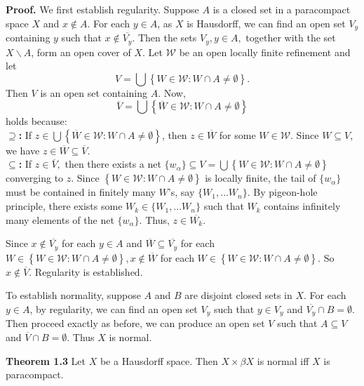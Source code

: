 \documentclass{article}
\begin{document}
\textbf{Proof.} We first establish regularity. Suppose $A$ is a closed set in a paracompact space $X$ and $x\notin A$. For each $y\in A$, as $X$ is Hausdorff, we can find an open set $V_y$ containing $y$ such that $x\notin \overline{V_y}$. Then the sets $V_y, y\in A,$ together with the set $X\backslash A$, form an open cover of $X$. Let $\mathcal{W}$ be an open locally finite refinement and let 
$$V=\bigcup\left\{ W\in \mathcal{W}: W\cap A\neq \emptyset\right\}.$$
\vskip 5pt
Then $V$ is an open set containing $A$. Now, 
$$\overline{V}=\bigcup\left\{ \overline{W}\in \mathcal{W}: W\cap A\neq \emptyset\right\}$$ holds because:\\
\textbf{$\supseteq$:} If $z\in \bigcup\left\{ \overline{W}\in \mathcal{W}: W\cap A\neq \emptyset\right\}$, then $z\in \overline{W}$ for some $W \in \mathcal{W}.$ Since $W\subseteq V$, we have $z\in \overline{W}\subseteq \overline{V}.$\\
\textbf{$\subseteq$:} If $z\in \overline{V},$ then there exists a net $\{w_\alpha\}\subseteq V=\bigcup\left\{ W\in \mathcal{W}: W\cap A\neq \emptyset\right\}$ converging to $z$. Since $\left\{W\in \mathcal{W}: W\cap A \neq \emptyset\right\}$ is locally finite, the tail of $\{w_\alpha\}$ must be contained in finitely many $W$'s, say $\{W_1,\dots W_n\}$. By pigeon-hole principle, there exists some $W_k\in \{W_1,\dots W_n\}$
such that $W_k$ contains infinitely many elements of the net $\{w_\alpha\}.$ Thus, $z\in \overline{W_k}$.
\vskip 15pt

Since $x\notin \overline{V_y}$ for each $y\in A$ and $\overline{W}\subseteq \overline{V_y}$ for each $W\in \left\{W\in \mathcal{W}: W\cap A\neq \emptyset\right\}, x\notin \overline{W}$ for each $W\in \left\{W\in \mathcal{W}: W\cap A\neq \emptyset\right\}.$ So $x\notin \overline{V}.$ Regularity is established. 


\vskip 15pt

To establish normality, suppose $A$ and $B$ are disjoint closed sets in $X$. For each $y\in A$, by regularity, 
we can find an open set $V_y$ such that $y\in V_y$ and $\overline{V_y}\cap B= \emptyset$. Then proceed exactly as before, we can 
produce an open set $V$ such that $A\subseteq V$ and $\overline{V}\cap B=\emptyset.$ Thus $X$ is normal.




\vskip 35pt



\textbf{Theorem 1.3} Let $X$ be a Hausdorff space. Then $X \times \beta X$ is normal iff $X$ is paracompact. 
\end{document}
